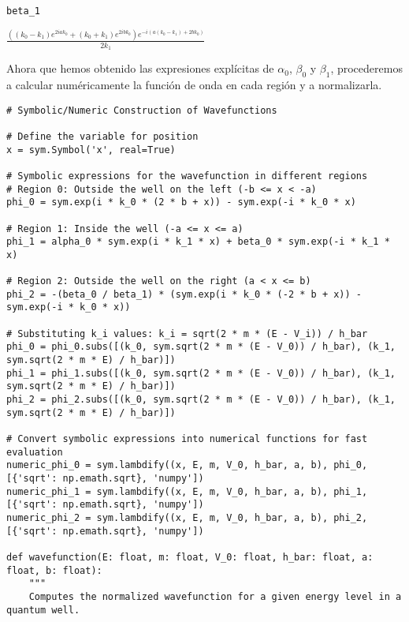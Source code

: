 \documentclass[11pt]{article}
\begin{document}
\begin{verbatim}
beta_1
\end{verbatim}

\label{org177b504}
\(\displaystyle \frac{\left(\left(k_{0} - k_{1}\right) e^{2 i a k_{0}} + \left(k_{0} + k_{1}\right) e^{2 i b k_{0}}\right) e^{- i \left(a \left(k_{0} - k_{1}\right) + 2 b k_{0}\right)}}{2 k_{1}}\)

Ahora que hemos obtenido las expresiones explícitas de \(\alpha_0\),
\(\beta_0\) y \(\beta_1\), procederemos a calcular numéricamente la
función de onda en cada región y a normalizarla.

\begin{verbatim}
# Symbolic/Numeric Construction of Wavefunctions

# Define the variable for position
x = sym.Symbol('x', real=True)

# Symbolic expressions for the wavefunction in different regions
# Region 0: Outside the well on the left (-b <= x < -a)
phi_0 = sym.exp(i * k_0 * (2 * b + x)) - sym.exp(-i * k_0 * x)

# Region 1: Inside the well (-a <= x <= a)
phi_1 = alpha_0 * sym.exp(i * k_1 * x) + beta_0 * sym.exp(-i * k_1 * x)

# Region 2: Outside the well on the right (a < x <= b)
phi_2 = -(beta_0 / beta_1) * (sym.exp(i * k_0 * (-2 * b + x)) - sym.exp(-i * k_0 * x))

# Substituting k_i values: k_i = sqrt(2 * m * (E - V_i)) / h_bar
phi_0 = phi_0.subs([(k_0, sym.sqrt(2 * m * (E - V_0)) / h_bar), (k_1, sym.sqrt(2 * m * E) / h_bar)])
phi_1 = phi_1.subs([(k_0, sym.sqrt(2 * m * (E - V_0)) / h_bar), (k_1, sym.sqrt(2 * m * E) / h_bar)])
phi_2 = phi_2.subs([(k_0, sym.sqrt(2 * m * (E - V_0)) / h_bar), (k_1, sym.sqrt(2 * m * E) / h_bar)])

# Convert symbolic expressions into numerical functions for fast evaluation
numeric_phi_0 = sym.lambdify((x, E, m, V_0, h_bar, a, b), phi_0, [{'sqrt': np.emath.sqrt}, 'numpy'])
numeric_phi_1 = sym.lambdify((x, E, m, V_0, h_bar, a, b), phi_1, [{'sqrt': np.emath.sqrt}, 'numpy'])
numeric_phi_2 = sym.lambdify((x, E, m, V_0, h_bar, a, b), phi_2, [{'sqrt': np.emath.sqrt}, 'numpy'])

def wavefunction(E: float, m: float, V_0: float, h_bar: float, a: float, b: float):
    """
    Computes the normalized wavefunction for a given energy level in a quantum well.


\end{verbatim}
\end{document}
